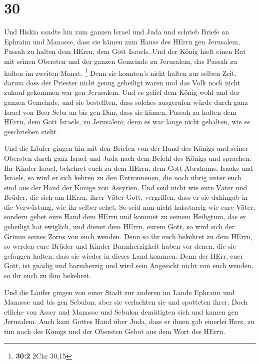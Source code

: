 \hypertarget{section-29}{%
\section{30}\label{section-29}}

 Und Hiskia sandte hin zum ganzen Israel und Juda und
schrieb Briefe an Ephraim und Manasse, dass sie kämen zum Hause des
HErrn gen Jerusalem, Passah zu halten dem HErrn, dem Gott Israels.
 Und der König hielt einen Rat mit seinen Obersten und der
ganzen Gemeinde zu Jerusalem, das Passah zu halten im zweiten Monat.
\footnote{\textbf{30:2} 2Chr 30,15}  Denn sie konnten's
nicht halten zur selben Zeit, darum dass der Priester nicht genug
geheiligt waren und das Volk noch nicht zuhauf gekommen war gen
Jerusalem.  Und es gefiel dem König wohl und der ganzen
Gemeinde,  und sie bestellten, dass solches ausgerufen
würde durch ganz Israel von Beer-Seba an bis gen Dan, dass sie kämen,
Passah zu halten dem HErrn, dem Gott Israels, zu Jerusalem; denn es war
lange nicht gehalten, wie es geschrieben steht.

 Und die Läufer gingen hin mit den Briefen von der Hand
des Königs und seiner Obersten durch ganz Israel und Juda nach dem
Befehl des Königs und sprachen: Ihr Kinder Israel, bekehret euch zu dem
HErrn, dem Gott Abrahams, Isaaks und Israels, so wird er sich kehren zu
den Entronnenen, die noch übrig unter euch sind aus der Hand der Könige
von Assyrien.  Und seid nicht wie eure Väter und Brüder,
die sich am HErrn, ihrer Väter Gott, vergriffen, dass er sie dahingab in
die Verwüstung, wie ihr selber sehet.  So seid nun nicht
halsstarrig wie eure Väter; sondern gebet eure Hand dem HErrn und kommet
zu seinem Heiligtum, das er geheiligt hat ewiglich, und dienet dem
HErrn, eurem Gott, so wird sich der Grimm seines Zorns von euch wenden.
 Denn so ihr euch bekehret zu dem HErrn, so werden eure
Brüder und Kinder Barmherzigkeit haben vor denen, die sie gefangen
halten, dass sie wieder in dieses Land kommen. Denn der HErr, euer Gott,
ist gnädig und barmherzig und wird sein Angesicht nicht von euch wenden,
so ihr euch zu ihm bekehret.

 Und die Läufer gingen von einer Stadt zur anderen im
Lande Ephraim und Manasse und bis gen Sebulon; aber sie verlachten sie
und spotteten ihrer.  Doch etliche von Asser und Manasse
und Sebulon demütigten sich und kamen gen Jerusalem. 
Auch kam Gottes Hand über Juda, dass er ihnen gab einerlei Herz, zu tun
nach des Königs und der Obersten Gebot aus dem Wort des HErrn.

